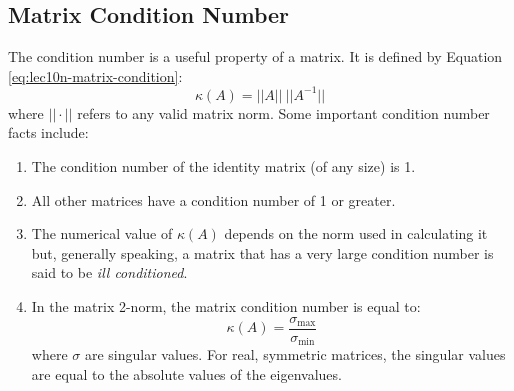 \subsection{Matrix Condition Number}
The condition number is a useful property of a matrix.  It is defined by Equation \ref{eq:lec10n-matrix-condition}:
\begin{equation}
\kappa(A) = ||A|| \ ||A^{-1}||
\label{eq:lec10n-matrix-condition}
\end{equation}
where $|| \cdot ||$ refers to any valid matrix norm.  Some important condition number facts include:
\begin{enumerate}
\item The condition number of the identity matrix (of any size) is 1.
\item All other matrices have a condition number of 1 or greater.
\item The numerical value of $\kappa(A)$ depends on the norm used in calculating it but, generally speaking, a matrix that has a very large condition number is said to be \emph{ill conditioned}.
\item In the matrix 2-norm, the matrix condition number is equal to: 
$$\kappa(A) = \frac{\sigma_{\text{max}}}{\sigma_{\text{min}}}$$
where $\sigma$ are singular values.  For real, symmetric matrices, the singular values are equal to the absolute values of the eigenvalues.
\end{enumerate}

